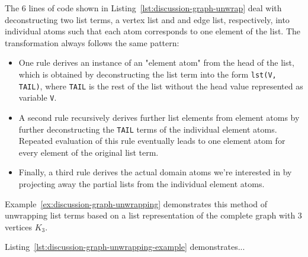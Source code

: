 The 6 lines of code shown in Listing~\ref{lst:discussion-graph-unwrap} deal with deconstructing two list terms, a vertex list and and edge list, respectively, into individual atoms such that each atom corresponds to one element of the list.
The transformation always follows the same pattern:
\begin{itemize}
    \item One rule derives an instance of an "element atom" from the head of the list, which is obtained by deconstructing the list term into the form \texttt{lst(V, TAIL)}, where \texttt{TAIL} is the rest of the list without the head value represented as variable \texttt{V}.
    \item A second rule recursively derives further list elements from element atoms by further deconstructing the \texttt{TAIL} terms of the individual element atoms. Repeated evaluation of this rule eventually leads to one element atom for every element of the original list term.
    \item Finally, a third rule derives the actual domain atoms we're interested in by projecting away the partial lists from the individual element atoms.
\end{itemize}    

Example~\ref{ex:discussion-graph-unwrapping} demonstrates this method of unwrapping list terms based on a list representation of the complete graph with 3 vertices $K_3$.

\begin{example}
\label{ex:discussion-graph-unwrapping} 
Listing~\ref{lst:discussion-graph-unwrapping-example} demonstrates...   
\end{example}    